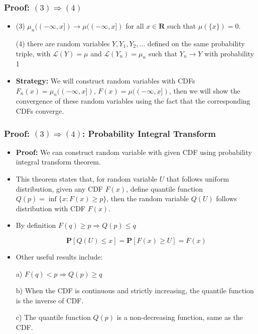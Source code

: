\documentclass[handout]{beamer}
\newcommand{\BP}{\mathbf{P}}
\begin{document}
\frame
{
  \frametitle{Proof: $(3) \Rightarrow (4)$ } 

   \begin{itemize}

\item<1-> (3) $\mu_n((-\infty, x])\rightarrow \mu((-\infty, x])$ for all $x\in \mathbf{R}$ such that $\mu(\{x\})=0$.
                                            \vspace{2mm}

              {\color{blue}  (4) there are random variables $Y, Y_1, Y_2, \ldots$ defined on the same probability triple, with $\mathcal{L} (Y)=\mu$ and $\mathcal{L} (Y_n)=\mu_n $ such that $Y_n\rightarrow Y$ with probability 1 }
                                                           \vspace{2mm}

               
\item<2-> \textbf{Strategy:}  We will construct random variables with CDFs $F_n(x)=\mu_n((-\infty, x])$, $F(x)=\mu((-\infty, x])$, then we will show the convergence of these random variables using the fact that the corresponding CDFs converge.
                     
\end{itemize}
}

\frame
{
  \frametitle{Proof: $(3) \Rightarrow (4)$:  Probability Integral Transform} 

\begin{itemize}

\item<1-> \textbf{Proof:} We can construct random variable with given CDF using probability integral transform theorem. 
                       
\item<2-> This theorem states that,  for random variable $U$ that follows uniform distribution, given any CDF $F(x)$, define quantile function $Q(p)=\inf \{x: F(x) \geq p\}$, then the random variable $Q(U)$ follows distribution with CDF $F(x)$. 
        
\item<3->[-] By definition $F(q)\geq p \Rightarrow Q(p)\leq q $
                     
                                          $$\BP[Q(U)\leq x] =\BP [F(x) \geq U]=F(x)$$
                                          
\item<4->[-] Other useful results include: 
                       
                      a) $F(q)< p \Rightarrow Q(p)\ge q $

                       
                       b) When the CDF is continuous and strictly increasing, the quantile function is the inverse of CDF.  
                       
                       
                       c) The quantile function $Q(p)$ is a non-decreasing function, same as the CDF.
                       
                                               \end{itemize}
}
\end{document}
